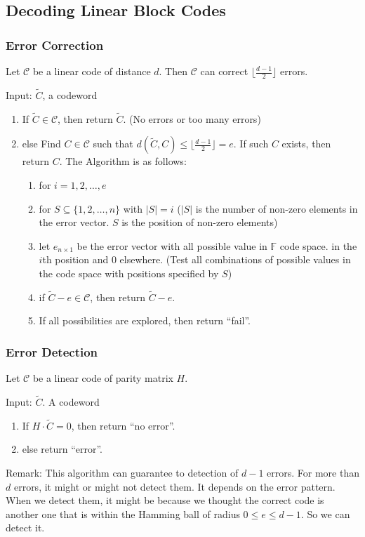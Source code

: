 \documentclass[letterpaper,12pt]{article}
\begin{document}
\subsection{Decoding Linear Block Codes}
\subsubsection{Error Correction}
Let $\mathcal{C}$ be a linear code of distance $d$. Then $\mathcal{C}$ can
correct $\lfloor \frac{d-1}{2}\rfloor$ errors.

Input: $\tilde{C}$, a codeword\begin{enumerate}
    \item If $\tilde{C}\in \mathcal{C}$, then return $\tilde{C}$. (No errors or too many
          errors)
    \item else Find $C\in \mathcal{C}$ such that $d(\tilde{C},C)\le \lfloor
              \frac{d-1}{2}\rfloor =e$. If such $C$ exists, then return $C$. The Algorithm is
          as follows:
          \begin{enumerate}
              \item for $i=1,2,\ldots,e$
              \item for $S\subseteq \{1,2,\ldots,n\}$ with $|S|=i$ ($|S|$ is the number of non-zero
                    elements in the error vector. $S$ is the position of non-zero elements)
              \item let $e_{n\times 1}$ be the error vector with all possible value in $\mathbb{F}$
                    code space. in the $i$th position and $0$ elsewhere. (Test all combinations of
                    possible values in the code space with positions specified by $S$)
              \item if $\tilde{C}-e\in \mathcal{C}$, then return $\tilde{C}-e$.
              \item If all possibilities are explored, then return ``fail''.
          \end{enumerate}
\end{enumerate}
\subsubsection{Error Detection}
Let $\mathcal{C}$ be a linear code of parity matrix $H$.

Input: $\tilde{C}$. A codeword\begin{enumerate}
    \item If $H\cdot \tilde{C}=0$, then return ``no error''.
    \item else return ``error''.
\end{enumerate}
Remark: This algorithm can guarantee to detection of $d-1$ errors. For more than $d$ errors, it might or might not detect them. It depends on the error pattern. When we detect them,  it might be because we thought the correct code is another one that is within the Hamming ball of radius $0\le e \le d-1$. So we can detect it.
\end{document}
